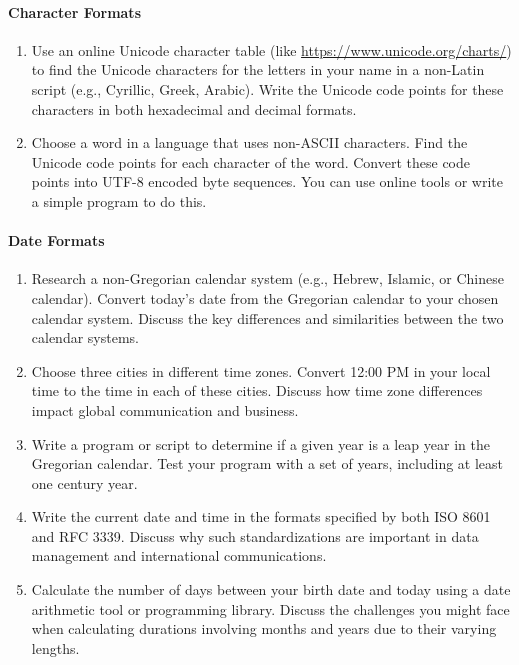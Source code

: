 \paragraph*{Character Formats}
\begin{enumerate}
	\item Use an online Unicode character table (like \url{https://www.unicode.org/charts/}) to find the Unicode characters for the letters in your name in a non-Latin script (e.g., Cyrillic, Greek, Arabic). Write the Unicode code points for these characters in both hexadecimal and decimal formats.
	\item Choose a word in a language that uses non-ASCII characters. Find the Unicode code points for each character of the word. Convert these code points into UTF-8 encoded byte sequences. You can use online tools or write a simple program to do this.
\end{enumerate}
\paragraph*{Date Formats}
\begin{enumerate}
    \item Research a non-Gregorian calendar system (e.g., Hebrew, Islamic, or Chinese calendar). Convert today's date from the Gregorian calendar to your chosen calendar system. Discuss the key differences and similarities between the two calendar systems.
    \item Choose three cities in different time zones. Convert 12:00 PM in your local time to the time in each of these cities. Discuss how time zone differences impact global communication and business.
    \item Write a program or script to determine if a given year is a leap year in the Gregorian calendar. Test your program with a set of years, including at least one century year.
    \item Write the current date and time in the formats specified by both ISO 8601 and RFC 3339. Discuss why such standardizations are important in data management and international communications.
    \item Calculate the number of days between your birth date and today using a date arithmetic tool or programming library. Discuss the challenges you might face when calculating durations involving months and years due to their varying lengths.
\end{enumerate}
